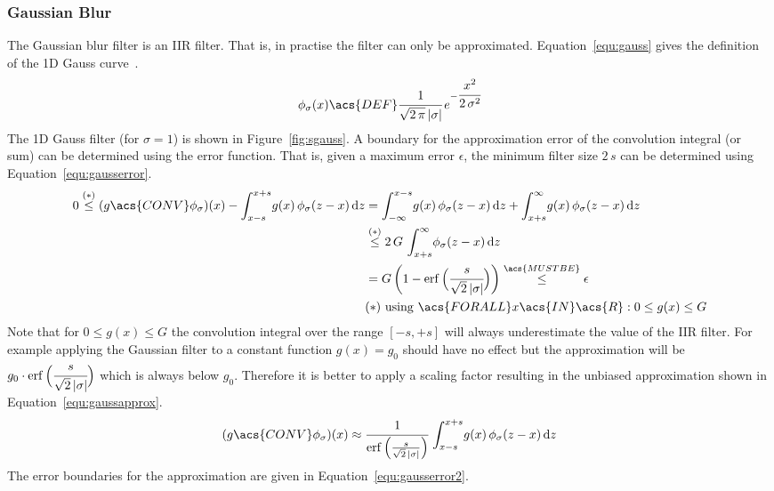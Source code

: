 \documentclass[12pt,a4paper,oneside,openright]{book}
\newcommand{\Eg}{For ex\-am\-ple }
\newcommand{\Ie}{That is, }
\newcommand{\equ}[1]{Equation~\ref{equ:#1}}
\newcommand{\fig}[1]{Figure~\ref{fig:#1}}
\begin{document}
\begin{CJK}{UTF8}{}
\subsubsection{Gaussian Blur}\label{cha:gauss}
The Gaussian blur filter is an \ac{IIR} filter. \Ie in practise the filter can only be approximated. \equ{gauss} gives the definition of the \acf{1D} Gauss curve~\citep{RefWorks:40}.
\begin{equation}\label{equ:gauss}
  \phi_\sigma(x)\acs{DEF}\cfrac{1}{\sqrt{2\,\pi}\,|\sigma|}\,e^{-\cfrac{x^2}{2\,\sigma^2}}
\end{equation}
The \ac{1D} Gauss filter (for $\sigma=1$) is shown in \fig{sgauss}.
A boundary for the approximation error of the convolution integral (or sum) can be determined using the error function. \Ie given a maximum error $\epsilon$, the minimum filter size $2\,s$ can be determined using \equ{gausserror}.
\begin{align}\label{equ:gausserror}
  \begin{split}
  0\overset{\mathrm{(*)}}{\le}(g\acs{CONV}\phi_\sigma)(x)-\int_{x-s}^{x+s}\! g(x)\,\phi_\sigma(z-x)\,\mathrm{d}z&=\int_{-\infty}^{x-s}\! g(x)\,\phi_\sigma(z-x)\,\mathrm{d}z+\int_{x+s}^{\infty}\! g(x)\,\phi_\sigma(z-x)\,\mathrm{d}z\\
  &\overset{\mathrm{(*)}}{\le} 2\,G\,\int_{x+s}^{\infty}\!\phi_\sigma(z-x)\,\mathrm{d}z\,\\
  &=G\,\bigg(1-\operatorname{erf}\Big(\cfrac{s}{\sqrt{2}\,|\sigma|}\Big)\bigg)\overset{\acs{MUSTBE}}{\le}\epsilon\\
  &\mathrm{(*)\ using\ }\acs{FORALL}x\acs{IN}\acs{R}:0\le g(x)\le G
  \end{split}
\end{align}
Note that for $0\le g(x)\le G$ the convolution integral over the range $[-s,+s]$ will always underestimate the value of the \ac{IIR} filter. \Eg applying the Gaussian filter to a constant function $g(x)=g_0$ should have no effect but the approximation will be $g_0\cdot\operatorname{erf}\Big(\cfrac{s}{\sqrt{2}\,|\sigma|}\Big)$ which is always below $g_0$. Therefore it is better to apply a scaling factor resulting in the unbiased approximation shown in \equ{gaussapprox}.
\begin{equation}\label{equ:gaussapprox}
  (g\acs{CONV}\phi_\sigma)(x)\approx\cfrac{1}{\operatorname{erf}\Big(\frac{s}{\sqrt{2}\,|\sigma|}\Big)}\,\int_{x-s}^{x+s}\! g(x)\,\phi_\sigma(z-x)\,\mathrm{d}z
\end{equation}
The error boundaries for the approximation are given in \equ{gausserror2}.

\end{CJK}
\end{document}
